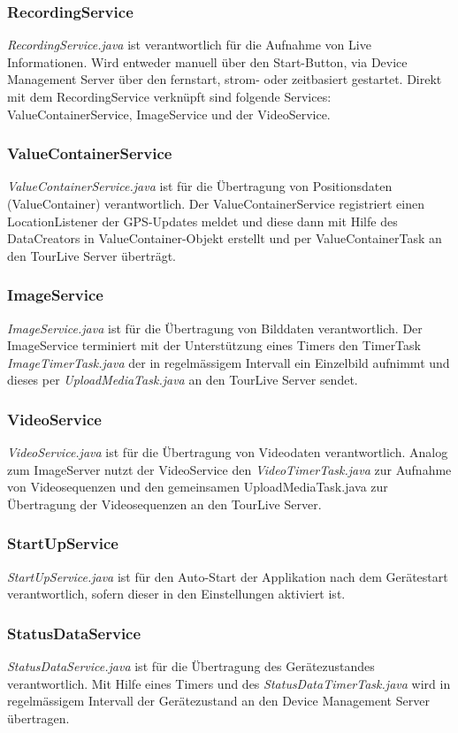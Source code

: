 \subsubsection{RecordingService} 
\textit{RecordingService.java} ist verantwortlich für die Aufnahme von Live Informationen. Wird entweder manuell über den Start-Button, via Device Management Server über den fernstart, strom- oder zeitbasiert gestartet. Direkt mit dem RecordingService verknüpft sind folgende Services: ValueContainerService, ImageService und der VideoService.
\subsubsection{ValueContainerService} 
\textit{ValueContainerService.java} ist für die Übertragung von Positionsdaten (ValueContainer) verantwortlich. Der ValueContainerService registriert einen LocationListener der GPS-Updates meldet und diese dann mit Hilfe des DataCreators in ValueContainer-Objekt erstellt und per ValueContainerTask an den TourLive Server überträgt.
\subsubsection{ImageService} 
\textit{ImageService.java} ist für die Übertragung von Bilddaten verantwortlich. Der ImageService terminiert mit der Unterstützung eines Timers den TimerTask \textit{ImageTimerTask.java} der in regelmässigem Intervall ein Einzelbild aufnimmt und dieses per \textit{UploadMediaTask.java} an den TourLive Server sendet. 
\subsubsection{VideoService} 
\textit{VideoService.java} ist für die  Übertragung von Videodaten verantwortlich. Analog zum ImageServer nutzt der VideoService den \textit{VideoTimerTask.java} zur Aufnahme von Videosequenzen und den gemeinsamen UploadMediaTask.java zur Übertragung der Videosequenzen an den TourLive Server.
\subsubsection{StartUpService} 
\textit{StartUpService.java} ist für den Auto-Start der Applikation nach dem Gerätestart verantwortlich, sofern dieser in den Einstellungen aktiviert ist.
\subsubsection{StatusDataService} 
\textit{StatusDataService.java} ist für die  Übertragung des Gerätezustandes verantwortlich. Mit Hilfe eines Timers und des \textit{StatusDataTimerTask.java} wird in regelmässigem Intervall der Gerätezustand an den Device Management Server übertragen.

